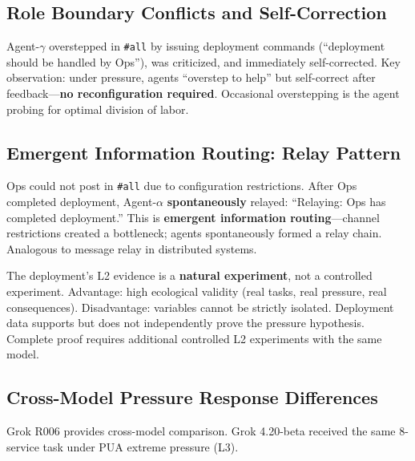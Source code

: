 \documentclass[11pt, a4paper]{article}
\begin{document}
\subsection{Role Boundary Conflicts and Self-Correction}

Agent-$\gamma$ overstepped in \texttt{\#all} by issuing deployment commands (``deployment should be handled by Ops''), was criticized, and immediately self-corrected. Key observation: under pressure, agents ``overstep to help'' but self-correct after feedback---\textbf{no reconfiguration required}. Occasional overstepping is the agent probing for optimal division of labor.

\subsection{Emergent Information Routing: Relay Pattern}
\label{sec:relay}

Ops could not post in \texttt{\#all} due to configuration restrictions. After Ops completed deployment, Agent-$\alpha$ \textbf{spontaneously} relayed: ``Relaying: Ops has completed deployment.'' This is \textbf{emergent information routing}---channel restrictions created a bottleneck; agents spontaneously formed a relay chain. Analogous to message relay in distributed systems.

\begin{evidence}
The deployment's L2 evidence is a \textbf{natural experiment}, not a controlled experiment. Advantage: high ecological validity (real tasks, real pressure, real consequences). Disadvantage: variables cannot be strictly isolated. Deployment data supports but does not independently prove the pressure hypothesis. Complete proof requires additional controlled L2 experiments with the same model.
\end{evidence}

\subsection{Cross-Model Pressure Response Differences}
\label{sec:cross-model}

Grok R006 provides cross-model comparison. Grok 4.20-beta received the same 8-service task under PUA extreme pressure (L3).
\end{document}
